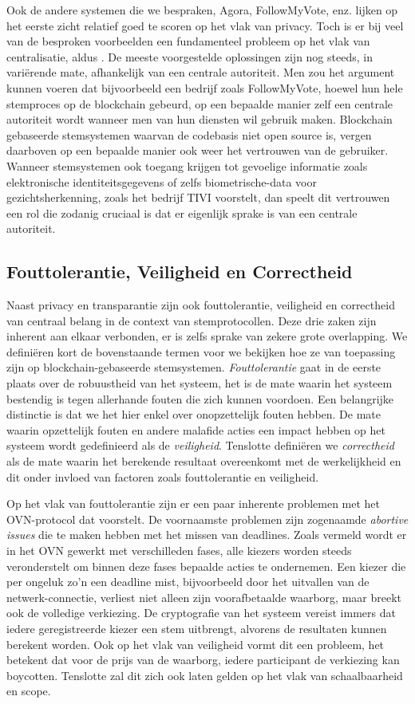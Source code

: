 		Ook  de andere systemen die we bespraken, Agora, FollowMyVote, enz. lijken op het eerste zicht relatief goed te scoren op het vlak van privacy. Toch is er bij veel van de besproken voorbeelden een fundamenteel probleem op het vlak van centralisatie, aldus \textcite{McCorry2017}. De meeste voorgestelde oplossingen zijn nog steeds, in variërende mate, afhankelijk van een centrale autoriteit. Men zou het argument kunnen voeren dat bijvoorbeeld een bedrijf zoals FollowMyVote, hoewel hun hele stemproces op de blockchain gebeurd, op een bepaalde manier zelf een centrale autoriteit wordt wanneer men van hun diensten wil gebruik maken. Blockchain gebaseerde stemsystemen waarvan de codebasis  niet open source is, vergen daarboven op een bepaalde manier ook weer het vertrouwen van de gebruiker. Wanneer stemsystemen ook toegang krijgen tot gevoelige informatie zoals elektronische identiteitsgegevens of zelfs biometrische-data voor gezichtsherkenning, zoals het bedrijf TIVI voorstelt, dan speelt dit vertrouwen een rol die zodanig cruciaal is dat er eigenlijk sprake is van een centrale autoriteit.
	\subsection{Fouttolerantie, Veiligheid en Correctheid}
	
	Naast privacy en transparantie zijn ook fouttolerantie, veiligheid en correctheid van centraal belang in de context van stemprotocollen. Deze drie zaken zijn inherent aan elkaar verbonden, er is zelfs sprake van zekere grote overlapping. We definiëren kort de bovenstaande termen voor we bekijken hoe ze van toepassing zijn op blockchain-gebaseerde stemsystemen. \textit{Fouttolerantie} gaat in de eerste plaats over de robuustheid  van het systeem, het is de mate waarin het systeem bestendig is tegen allerhande fouten die zich kunnen voordoen. Een belangrijke distinctie is dat we het hier enkel over onopzettelijk fouten hebben. De mate waarin opzettelijk fouten en andere malafide acties een impact hebben op het systeem wordt gedefinieerd als de \textit{veiligheid}. Tenslotte definiëren we \textit{correctheid} als de mate waarin het berekende resultaat overeenkomt met de werkelijkheid en dit onder invloed van factoren zoals fouttolerantie en veiligheid.
	
	Op het vlak van fouttolerantie zijn er een paar inherente problemen met het OVN-protocol dat \textcite{McCorry2017} voorstelt. De voornaamste problemen zijn zogenaamde \textit{abortive issues} die te maken hebben met het missen van deadlines. Zoals vermeld wordt er in het OVN gewerkt met verschilleden fases, alle kiezers worden steeds veronderstelt om binnen deze fases bepaalde acties te ondernemen. Een kiezer die per ongeluk zo'n een deadline mist, bijvoorbeeld door het uitvallen van de netwerk-connectie, verliest niet alleen zijn voorafbetaalde waarborg, maar breekt ook de volledige verkiezing. De cryptografie van het systeem vereist immers dat iedere geregistreerde kiezer een stem uitbrengt, alvorens de resultaten kunnen berekent worden. Ook op het vlak van veiligheid vormt dit een probleem, het betekent dat voor de prijs van de waarborg, iedere participant de verkiezing kan boycotten. Tenslotte zal dit zich ook laten gelden op het vlak van schaalbaarheid en scope. 
	
